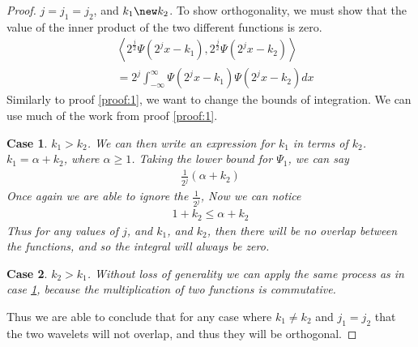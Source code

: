 \documentclass[12pt]{amsart}
\newtheorem{case}{Case}
\begin{document}
\begin{proof}\label{proof:2}
  $j=j_1=j_2$, and $k_1 \new k_2$. To show orthogonality, we must show that the
  value of the inner product of the two different functions is zero.
  \begin{align}
    &\left<2^{\frac{j}{2}}\Psi\left(2^jx-k_1\right),
    2^{\frac{j}{2}}\Psi\left(2^jx-k_2\right)\right>\\
    &=2^j\int_{-\infty}^{\infty}\Psi\left(2^jx-k_1\right)\Psi\left(2^jx-k_2\right)dx
  \end{align}
  Similarly to proof \ref{proof:1}, we want to change the bounds of
  integration. We can use much of the work from proof \ref{proof:1}.
  \begin{case}\label{case:2.1}
    $k_1>k_2$. We can then write an expression for $k_1$ in terms of $k_2$.
    $k_1 = \alpha + k_2$, where $\alpha \geq 1$. Taking the lower bound for
    $\Psi_1$, we can say
    \begin{align}
      \frac{1}{2^j}(\alpha+k_2)
    \end{align}
    Once again we are able to ignore the $\frac{1}{2^j}$, Now we can notice
    \begin{align}
      1+k_2 \leq \alpha + k_2
    \end{align}
    Thus for any values of $j$, and $k_1$, and $k_2$, then there will be no
    overlap between the functions, and so the integral will always be zero.
  \end{case}
  \begin{case}\label{case:2.2}
    $k_2>k_1$. Without loss of generality we can apply the same process as in
    case \ref{case:2.1}, because the multiplication of two functions is
    commutative.
  \end{case}
  Thus we are able to conclude that for any case where $k_1 \neq k_2$ and $j_1
  =j_2$ that the two wavelets will not overlap, and thus they will be
  orthogonal.
\end{proof}
\end{document}
